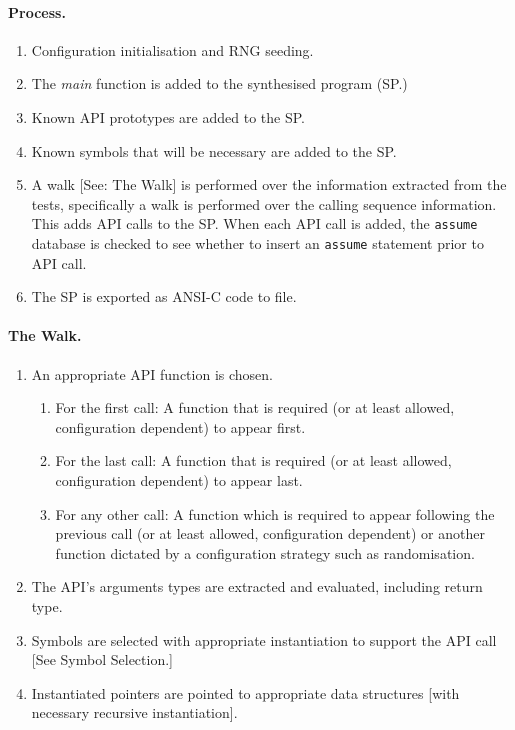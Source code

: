 \documentclass[EPiC]{easychair}
\begin{document}
\paragraph{Process.}
\begin{enumerate}
	\item Configuration initialisation and RNG seeding.
	\item The \textit{main} function is added to the synthesised program (SP.)
	\item Known API prototypes are added to the SP.
	\item Known symbols that will be necessary are added to the SP.
	\item A walk [See: The Walk] is performed over the information extracted from the tests, specifically a walk is performed over the calling sequence information.  This adds API calls to the SP.  When each API call is added, the \texttt{assume} database is checked to see whether to insert an \texttt{assume} statement prior to API call.
	\item The SP is exported as ANSI-C code to file.	
\end{enumerate}

\paragraph{The Walk.}
\begin{enumerate}
	\item An appropriate API function is chosen.
	\begin{enumerate}[label=(\alph*)]
		\item For the first call:  A function that is required (or at least allowed, configuration dependent) to appear first.
		\item For the last call:   A function that is required (or at least allowed, configuration dependent) to appear last.
		\item For any other call:  A function which is required to appear following the previous call (or at least allowed, configuration dependent) or another function dictated by a configuration strategy such as randomisation.
	\end{enumerate}
	\item The API's arguments types are extracted and evaluated, including return type.
	\item Symbols are selected with appropriate instantiation to support the API call [See Symbol Selection.]
	\item Instantiated pointers are pointed to appropriate data structures [with necessary recursive instantiation].
\end{enumerate}
\end{document}
